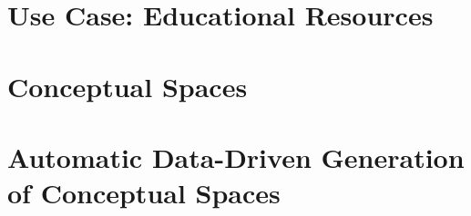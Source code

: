 \documentclass[11pt,
  paper=a4, 
  twoside,  %
  hidelinks,
  bibliography=totocnumbered,
	captions=tableheading,
	BCOR=10mm
]{scrreprt}
\theoremstyle{definition}
\begin{document}
\section{Use Case: Educational Resources}

\section{Conceptual Spaces}









\section{Automatic Data-Driven Generation of Conceptual Spaces}

\end{document}
